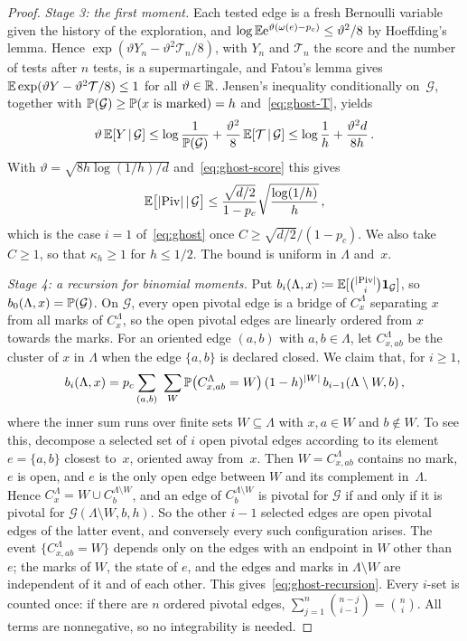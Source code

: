\begin{proof}
\emph{Stage 3: the first moment.} Each tested edge is a fresh Bernoulli variable given the history of
the exploration, and $\log\mathbb E\mathrm{e}^{\vartheta(\omega(e)-p_c)}\le \vartheta^2/8$ by Hoeffding's lemma. Hence
$\exp(\vartheta Y_n-\vartheta^2\mathcal T_n/8)$, with $Y_n$ and $\mathcal T_n$ the score and the number of
tests after $n$ tests, is a supermartingale, and Fatou's lemma gives
$\mathbb E\exp(\vartheta Y-\vartheta^2\mathcal T/8)\le1$ for all $\vartheta\in\mathbb R$. Jensen's inequality conditionally
on~$\mathcal G$, together with $\mathbb P(\mathcal G)\ge\mathbb P(x\text{ is marked})=h$ and~\eqref{eq:ghost-T},
yields
\begin{equation*}
  \vartheta\,\mathbb E[Y\,\lvert\,\mathcal G]\le\log\frac1{\mathbb P(\mathcal G)}+\frac{\vartheta^2}8\,\mathbb E[\mathcal T\,\lvert\,\mathcal G]
  \le\log\frac1h+\frac{\vartheta^2d}{8h}\,.
\end{equation*}
With $\vartheta=\sqrt{8h\log(1/h)/d}$ and~\eqref{eq:ghost-score} this gives
\begin{equation*}
  \mathbb E\bigl[\lvert\operatorname{Piv}\rvert\,\lvert\,\mathcal G\bigr]\le\frac{\sqrt{d/2}}{1-p_c}\sqrt{\frac{\log(1/h)}{h}}\,,
\end{equation*}
which is the case $i=1$ of~\eqref{eq:ghost} once $C\ge\sqrt{d/2}/(1-p_c)$. We also take $C\ge1$, so
that $\kappa_h\ge1$ for $h\le1/2$. The bound is uniform in $\Lambda$ and~$x$.

\emph{Stage 4: a recursion for binomial moments.} Put $b_i(\Lambda,x)\coloneqq
\mathbb E[\binom{\lvert\operatorname{Piv}\rvert}{i}\mathbf{1}_{\mathcal G}]$, so $b_0(\Lambda,x)=\mathbb P(\mathcal G)$. On $\mathcal G$, every
open pivotal edge is a bridge of $C_x^\Lambda$ separating $x$ from all marks of $C_x^\Lambda$, so the
open pivotal edges are linearly ordered from $x$ towards the marks. For an oriented edge $(a,b)$ with
$a,b\in\Lambda$, let $C^\Lambda_{x,ab}$ be the cluster of $x$ in $\Lambda$ when the edge $\{a,b\}$ is
declared closed. We claim that, for $i\ge1$,
\begin{equation}\label{eq:ghost-recursion}
  b_i(\Lambda,x)=p_c\sum_{(a,b)}\ \sum_{W}\PP\bigl(C^\Lambda_{x,ab}=W\bigr)\,(1-h)^{\abs{W}}\,
  b_{i-1}(\Lambda\setminus W,b)\,,
\end{equation}
where the inner sum runs over finite sets $W\subseteq\Lambda$ with $x,a\in W$ and $b\notin W$. To see
this, decompose a selected set of $i$ open pivotal edges according to its element $e=\{a,b\}$ closest
to~$x$, oriented away from~$x$. Then $W=C^\Lambda_{x,ab}$ contains no mark, $e$ is open, and $e$ is the
only open edge between $W$ and its complement in~$\Lambda$. Hence $C_x^\Lambda=W\cup
C_b^{\Lambda\setminus W}$, and an edge of $C_b^{\Lambda\setminus W}$ is pivotal for $\mathcal G$ if and
only if it is pivotal for $\mathcal G(\Lambda\setminus W,b,h)$. So the other $i-1$ selected edges are
open pivotal edges of the latter event, and conversely every such configuration arises. The event
$\{C^\Lambda_{x,ab}=W\}$ depends only on the edges with an endpoint in $W$ other than~$e$; the marks of
$W$, the state of $e$, and the edges and marks in $\Lambda\setminus W$ are independent of it and of
each other. This gives~\eqref{eq:ghost-recursion}. Every $i$-set is counted once: if there are $n$
ordered pivotal edges, $\sum_{j=1}^n\binom{n-j}{i-1}=\binom ni$. All terms are nonnegative, so no
integrability is needed.


\end{proof}
